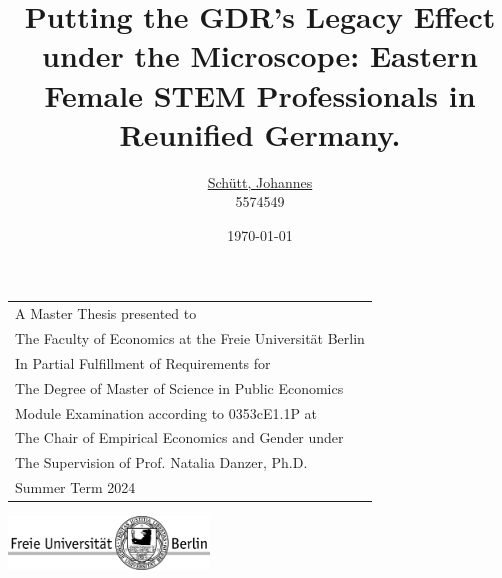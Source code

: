 \documentclass[a4paper, oneside, hyperfootnotes = false]{article}
\title{Putting the GDR's Legacy Effect under the Microscope: \linebreak Eastern Female STEM Professionals in Reunified Germany.}
\author{\href{mailto:johannes.schuett@fu-berlin.de}{Schütt, Johannes} \\
5574549}
\date{\today{}}
\begin{document}
{\fontsize{12pt}{18pt}\selectfont

\maketitle

\thispagestyle{empty}

\vspace{1.5cm}

\noindent\begin{tabular}{l}
	A Master Thesis presented to \\
	The Faculty of Economics at the Freie Universität Berlin \\
    [\normalbaselineskip]
    In Partial Fulfillment of Requirements for \\
    The Degree of Master of Science in Public Economics\\
    [\normalbaselineskip]
    Module Examination according to 0353cE1.1P at \\
    The Chair of Empirical Economics and Gender under \\
    The Supervision of Prof. Natalia Danzer, Ph.D. \\
    [\normalbaselineskip]
    Summer Term 2024
\end{tabular}

\vspace{3cm}

\begin{center}
    \includegraphics[width=0.4\textwidth, angle=0]{fu_logo.pdf}
\end{center}

\newpage

\pagestyle{plain}

{\fontsize{12pt}{15pt}\selectfont

\tableofcontents
\newpage

{}
\listoffigures

\vspace{2cm}

{}
\listoftables


\vspace{2cm}

}}
\end{document}
